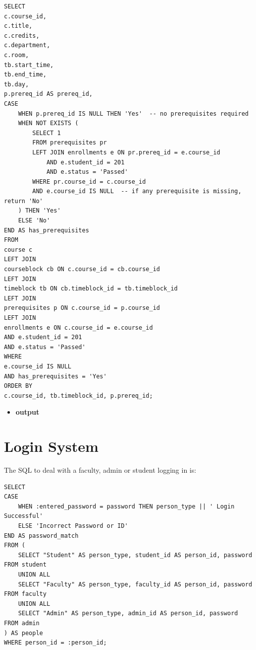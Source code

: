 \documentclass{report}
\makeatletter
\newenvironment{fullcenter}%
    {\@parboxrestore%
    \begin{adjustwidth}{}{\leftmargin}%
    \begin{center}%
    }{\end{center}%
    \end{adjustwidth}%
    }
\newcommand{\usection}[1]{\section*{#1}
\addcontentsline{toc}{section}{\protect\numberline{}#1}}
\makeatother
\begin{document}
\begin{lstlisting}
SELECT
c.course_id,
c.title,
c.credits,
c.department,
c.room,
tb.start_time,
tb.end_time,
tb.day,
p.prereq_id AS prereq_id,
CASE
    WHEN p.prereq_id IS NULL THEN 'Yes'  -- no prerequisites required
    WHEN NOT EXISTS (
        SELECT 1
        FROM prerequisites pr
        LEFT JOIN enrollments e ON pr.prereq_id = e.course_id
            AND e.student_id = 201
            AND e.status = 'Passed'
        WHERE pr.course_id = c.course_id
        AND e.course_id IS NULL  -- if any prerequisite is missing, return 'No'
    ) THEN 'Yes'
    ELSE 'No'
END AS has_prerequisites
FROM 
course c
LEFT JOIN 
courseblock cb ON c.course_id = cb.course_id
LEFT JOIN 
timeblock tb ON cb.timeblock_id = tb.timeblock_id
LEFT JOIN 
prerequisites p ON c.course_id = p.course_id
LEFT JOIN 
enrollments e ON c.course_id = e.course_id
AND e.student_id = 201
AND e.status = 'Passed'
WHERE 
e.course_id IS NULL
AND has_prerequisites = 'Yes'
ORDER BY 
c.course_id, tb.timeblock_id, p.prereq_id;
\end{lstlisting}

\begin{itemize}
    \item \textbf{output}
    \begin{fullcenter}
    \end{fullcenter}
\end{itemize}

\usection{Login System}

The SQL to deal with a faculty, admin or student logging in is:
\begin{lstlisting}
SELECT
CASE 
    WHEN :entered_password = password THEN person_type || ' Login Successful'
    ELSE 'Incorrect Password or ID' 
END AS password_match
FROM (
    SELECT "Student" AS person_type, student_id AS person_id, password FROM student
    UNION ALL
    SELECT "Faculty" AS person_type, faculty_id AS person_id, password FROM faculty
    UNION ALL
    SELECT "Admin" AS person_type, admin_id AS person_id, password FROM admin
) AS people
WHERE person_id = :person_id;
\end{lstlisting}
\end{document}
